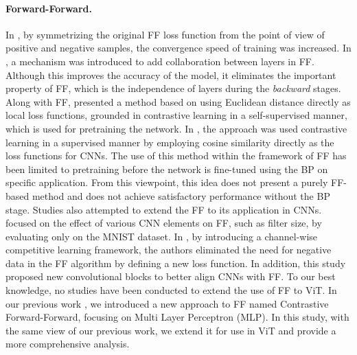 \paragraph{Forward-Forward.} In \cite{lee2023symba}, by symmetrizing the original FF loss function from the point of view of positive and negative samples, the convergence speed of training was increased. In \cite{lorberbom2024layer}, a mechanism was introduced to add collaboration between layers in FF. Although this improves the accuracy of the model, it eliminates the important property of FF, which is the independence of layers during the \textit{backward} stages. Along with FF, \cite{zhu2022contrastive} presented a method based on using Euclidean distance directly as local loss functions, grounded in contrastive learning in a self-supervised manner, which is used for pretraining the network. In \cite{ahamed2023ffcl}, the approach was used contrastive learning in a supervised manner by employing cosine similarity directly as the loss functions for CNNs. The use of this method within the framework of FF has been limited to pretraining before the network is fine-tuned using the BP on specific application. From this viewpoint, this idea does not present a purely FF-based method and does not achieve satisfactory performance without the BP stage. Studies \cite{scodellaro2023training, papachristodoulou2024convolutional} also attempted to extend the FF to its application in CNNs. \cite{scodellaro2023training} focused on the effect of various CNN elements on FF, such as filter size, by evaluating only on the MNIST \cite{lecun1998gradient} dataset. In \cite{papachristodoulou2024convolutional}, by introducing a channel-wise competitive learning framework, the authors eliminated the need for negative data in the FF algorithm by defining a new loss function. In addition, this study proposed new convolutional blocks to better align CNNs with FF. To our best knowledge, no studies have been conducted to extend the use of FF to ViT. In our previous work \cite{aghagolzadeh2024marginal}, we introduced a new approach to FF named Contrastive Forward-Forward, focusing on Multi Layer Perceptron (MLP). In this study, with the same view of our previous work, we extend it for use in ViT and provide a more comprehensive analysis.